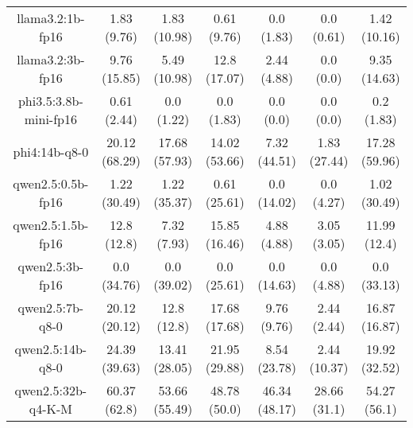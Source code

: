 \begin{table}[]
{\begin{tabular}{ccccccc}
        \multicolumn{1}{c|}{llama3.2:1b-fp16} & 1.83 (9.76) & 1.83 (10.98) & \multicolumn{1}{c|}{0.61 (9.76)} & 0.0 (1.83) & \multicolumn{1}{c|}{0.0 (0.61)} & 1.42 (10.16) \\
        

        \multicolumn{1}{c|}{llama3.2:3b-fp16} & 9.76 (15.85) & 5.49 (10.98) & \multicolumn{1}{c|}{12.8 (17.07)} & 2.44 (4.88) & \multicolumn{1}{c|}{0.0 (0.0)} & 9.35 (14.63) \\
        

        \multicolumn{1}{c|}{phi3.5:3.8b-mini-fp16} & 0.61 (2.44) & 0.0 (1.22) & \multicolumn{1}{c|}{0.0 (1.83)} & 0.0 (0.0) & \multicolumn{1}{c|}{0.0 (0.0)} & 0.2 (1.83) \\
        

        \multicolumn{1}{c|}{phi4:14b-q8-0} & 20.12 (68.29) & 17.68 (57.93) & \multicolumn{1}{c|}{14.02 (53.66)} & 7.32 (44.51) & \multicolumn{1}{c|}{1.83 (27.44)} & 17.28 (59.96) \\
        

        \multicolumn{1}{c|}{qwen2.5:0.5b-fp16} & 1.22 (30.49) & 1.22 (35.37) & \multicolumn{1}{c|}{0.61 (25.61)} & 0.0 (14.02) & \multicolumn{1}{c|}{0.0 (4.27)} & 1.02 (30.49) \\
        

        \multicolumn{1}{c|}{qwen2.5:1.5b-fp16} & 12.8 (12.8) & 7.32 (7.93) & \multicolumn{1}{c|}{15.85 (16.46)} & 4.88 (4.88) & \multicolumn{1}{c|}{3.05 (3.05)} & 11.99 (12.4) \\
        

        \multicolumn{1}{c|}{qwen2.5:3b-fp16} & 0.0 (34.76) & 0.0 (39.02) & \multicolumn{1}{c|}{0.0 (25.61)} & 0.0 (14.63) & \multicolumn{1}{c|}{0.0 (4.88)} & 0.0 (33.13) \\
        

        \multicolumn{1}{c|}{qwen2.5:7b-q8-0} & 20.12 (20.12) & 12.8 (12.8) & \multicolumn{1}{c|}{17.68 (17.68)} & 9.76 (9.76) & \multicolumn{1}{c|}{2.44 (2.44)} & 16.87 (16.87) \\
        

        \multicolumn{1}{c|}{qwen2.5:14b-q8-0} & 24.39 (39.63) & 13.41 (28.05) & \multicolumn{1}{c|}{21.95 (29.88)} & 8.54 (23.78) & \multicolumn{1}{c|}{2.44 (10.37)} & 19.92 (32.52) \\
        

        \multicolumn{1}{c|}{qwen2.5:32b-q4-K-M} & 60.37 (62.8) & 53.66 (55.49) & \multicolumn{1}{c|}{48.78 (50.0)} & 46.34 (48.17) & \multicolumn{1}{c|}{28.66 (31.1)} & 54.27 (56.1) \\
        


\end{tabular}}
\end{table}
